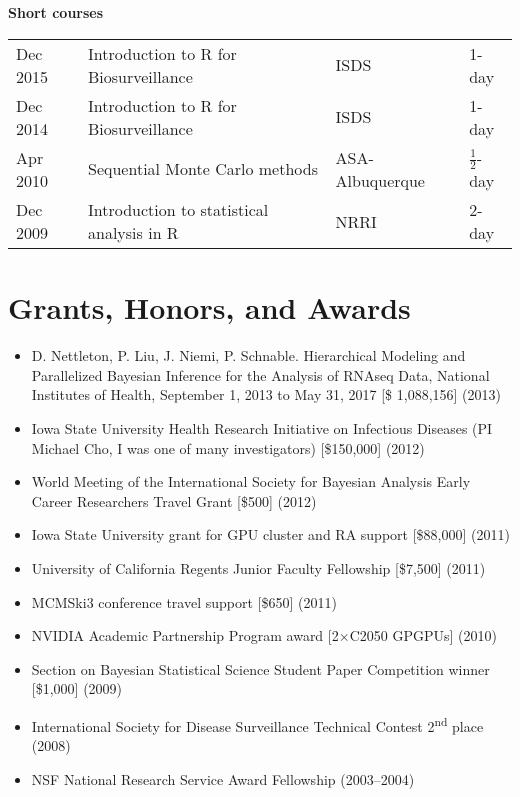 \documentclass[overlapped,line]{res}
\begin{document}
\begin{resume}
{\bf Short courses}

\begin{tabular}{llll}
Dec 2015 & Introduction to R for Biosurveillance & ISDS & 1-day \\
Dec 2014 & Introduction to R for Biosurveillance & ISDS & 1-day \\
Apr 2010 & Sequential Monte Carlo methods & ASA-Albuquerque & $\frac{1}{2}$-day \\
Dec 2009 & Introduction to statistical analysis in R & NRRI & 2-day
\end{tabular}




\section{\bf Grants, Honors, and Awards}

\begin{itemize}
\item D. Nettleton, P. Liu, J. Niemi, P. Schnable. Hierarchical Modeling and Parallelized Bayesian Inference for the Analysis of RNAseq Data, National Institutes of Health, September 1, 2013 to May 31, 2017 [\$ 1,088,156] (2013)

\item Iowa State University Health Research Initiative on Infectious Diseases (PI Michael Cho, I was one of many investigators) [\$150,000] (2012)
\item World Meeting of the International Society for Bayesian Analysis Early Career Researchers Travel Grant [\$500] (2012)
\item Iowa State University grant for GPU cluster and RA support [\$88,000] (2011)
\item University of California Regents Junior Faculty Fellowship [\$7,500] (2011)
\item MCMSki3 conference travel support [\$650] (2011)
\item NVIDIA Academic Partnership Program award [2$\times$C2050 GPGPUs] (2010)



\item Section on Bayesian Statistical Science Student Paper Competition winner [\$1,000] (2009)
\item International Society for Disease Surveillance Technical Contest 2\textsuperscript{nd} place (2008)
\item NSF National Research Service Award Fellowship (2003--2004)
\end{itemize}


\end{resume}
\end{document}
